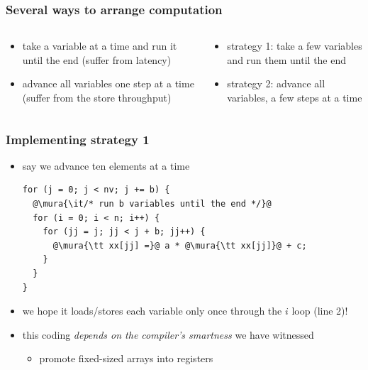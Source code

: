 \documentclass[12pt,dvipdfmx]{beamer}
\newcommand{\mura}[1]{{\color{purple}#1}}
\newcommand{\ao}[1]{{\color{blue}#1}}
\begin{document}
\begin{frame}
\frametitle{Several ways to arrange computation}
\begin{columns}
\begin{column}{0.5\textwidth}
\begin{itemize}
\item {\small take a variable at a time and run it until the end (suffer from latency)}
\def\svgwidth{0.7\textwidth}
{\scriptsize }
\item {\small advance all variables one step at a time (suffer from the store throughput)}
\def\svgwidth{0.7\textwidth}
{\scriptsize }
\end{itemize}

\end{column}
\begin{column}{0.5\textwidth}
\begin{itemize}
\item {\small strategy 1: take a few variables and run them until the end}
\def\svgwidth{0.7\textwidth}
{\scriptsize }
\item {\small strategy 2: advance all variables, a few steps at a time}
\def\svgwidth{0.7\textwidth}
{\scriptsize }
\end{itemize}
\end{column}
\end{columns}
\end{frame}

\begin{frame}[fragile]
\frametitle{Implementing strategy 1}
\begin{itemize}
\item say we advance ten elements at a time
\begin{lstlisting}
for (j = 0; j < nv; j += b) {
  @\mura{\it/* run b variables until the end */}@
  for (i = 0; i < n; i++) {
    for (jj = j; jj < j + b; jj++) {
      @\mura{\tt xx[jj] =}@ a * @\mura{\tt xx[jj]}@ + c;
    }
  }
}
\end{lstlisting}

\item we hope it loads/stores each
  variable only once through the $i$ loop (line 2)!
\item this coding \ao{\em depends on the compiler's smartness} we have witnessed
  \begin{itemize}
  \item promote fixed-sized arrays into registers
  \end{itemize}
\end{itemize}
\end{frame}
\end{document}
